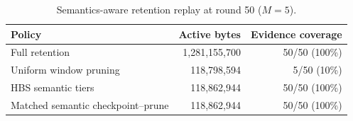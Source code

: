 \begin{table}[t]
\color{red}
\centering
\caption{Semantics-aware retention replay at round 50 ($M=5$).}
\label{tab:semantic_retention}
\small
\setlength{\tabcolsep}{3.5pt}
\renewcommand{\arraystretch}{1.16}
\begin{tabular*}{\linewidth}{@{\extracolsep{\fill}}lrr@{}}
\toprule
Policy & Active bytes & Evidence coverage \\
\midrule
Full retention & 1,281,155,700 & 50/50 (100\%) \\
Uniform window pruning & 118,798,594 & 5/50 (10\%) \\
HBS semantic tiers & 118,862,944 & 50/50 (100\%) \\
Matched semantic checkpoint--prune & 118,862,944 & 50/50 (100\%) \\
\bottomrule
\end{tabular*}
\end{table}

